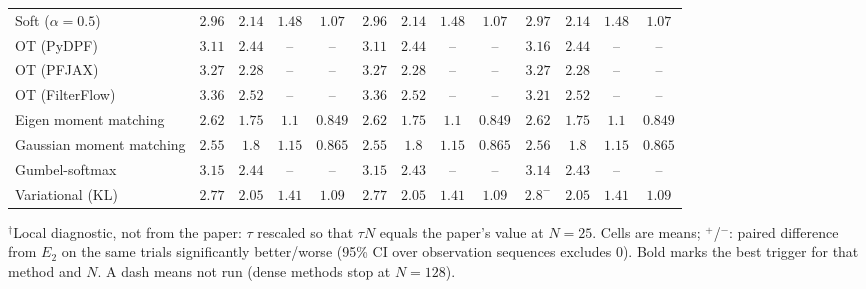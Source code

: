 \begin{table}[ht]
\begin{adjustbox}{max width=\linewidth}
\begin{tabular}{lcccc|cccc|cccc}
Soft ($\alpha{=}0.5$) & $\mathbf{2.96}$ & $2.14$ & $\mathbf{1.48}$ & $\mathbf{1.07}$ & $\mathbf{2.96}$ & $2.14$ & $\mathbf{1.48}$ & $\mathbf{1.07}$ & $2.97$ & $\mathbf{2.14}$ & $\mathbf{1.48}$ & $\mathbf{1.07}$ \\
OT (PyDPF) & $3.11$ & $2.44$ & -- & -- & $\mathbf{3.11}$ & $\mathbf{2.44}$ & -- & -- & $3.16$ & $2.44$ & -- & -- \\
OT (PFJAX) & $\mathbf{3.27}$ & $2.28$ & -- & -- & $3.27$ & $2.28$ & -- & -- & $3.27$ & $\mathbf{2.28}$ & -- & -- \\
OT (FilterFlow) & $3.36$ & $\mathbf{2.52}$ & -- & -- & $3.36$ & $2.52$ & -- & -- & $\mathbf{3.21}$ & $2.52$ & -- & -- \\
Eigen moment matching & $\mathbf{2.62}$ & $1.75$ & $1.1$ & $0.849$ & $2.62$ & $\mathbf{1.75}$ & $\mathbf{1.1}$ & $\mathbf{0.849}$ & $2.62$ & $1.75$ & $1.1$ & $0.849$ \\
Gaussian moment matching & $\mathbf{2.55}$ & $\mathbf{1.8}$ & $\mathbf{1.15}$ & $\mathbf{0.865}$ & $2.55$ & $1.8$ & $1.15$ & $0.865$ & $2.56$ & $\mathbf{1.8}$ & $1.15$ & $\mathbf{0.865}$ \\
Gumbel-softmax & $3.15$ & $2.44$ & -- & -- & $3.15$ & $\mathbf{2.43}$ & -- & -- & $\mathbf{3.14}$ & $2.43$ & -- & -- \\
Variational (KL) & $\mathbf{2.77}$ & $2.05$ & $1.41$ & $1.09$ & $2.77$ & $2.05$ & $\mathbf{1.41}$ & $1.09$ & $2.8^{-}$ & $\mathbf{2.05}$ & $1.41$ & $\mathbf{1.09}$ \\
\bottomrule
\end{tabular}
\end{adjustbox}
\par\smallskip\parbox{0.95\linewidth}{\footnotesize $^\dagger$Local diagnostic, not from the paper: $\tau$ rescaled so that $\tau N$ equals the paper's value at $N{=}25$. Cells are means; $^{+}$/$^{-}$: paired difference from $E_2$ on the same trials significantly better/worse (95\% CI over observation sequences excludes 0). Bold marks the best trigger for that method and $N$. A dash means not run (dense methods stop at $N{=}128$).}
\end{table}

